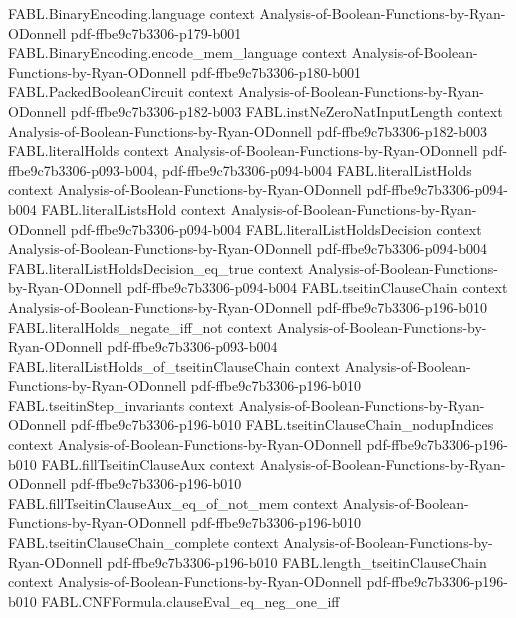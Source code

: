 \begin{theorem}
\proofstep
  {FABL.BinaryEncoding.language}
  {context}
  {Analysis-of-Boolean-Functions-by-Ryan-ODonnell}
  {pdf-ffbe9c7b3306-p179-b001}
\proofstep
  {FABL.BinaryEncoding.encode_mem_language}
  {context}
  {Analysis-of-Boolean-Functions-by-Ryan-ODonnell}
  {pdf-ffbe9c7b3306-p180-b001}
\proofstep
  {FABL.PackedBooleanCircuit}
  {context}
  {Analysis-of-Boolean-Functions-by-Ryan-ODonnell}
  {pdf-ffbe9c7b3306-p182-b003}
\proofstep
  {FABL.instNeZeroNatInputLength}
  {context}
  {Analysis-of-Boolean-Functions-by-Ryan-ODonnell}
  {pdf-ffbe9c7b3306-p182-b003}
\proofstep
  {FABL.literalHolds}
  {context}
  {Analysis-of-Boolean-Functions-by-Ryan-ODonnell}
  {pdf-ffbe9c7b3306-p093-b004,
    pdf-ffbe9c7b3306-p094-b004}
\proofstep
  {FABL.literalListHolds}
  {context}
  {Analysis-of-Boolean-Functions-by-Ryan-ODonnell}
  {pdf-ffbe9c7b3306-p094-b004}
\proofstep
  {FABL.literalListsHold}
  {context}
  {Analysis-of-Boolean-Functions-by-Ryan-ODonnell}
  {pdf-ffbe9c7b3306-p094-b004}
\proofstep
  {FABL.literalListHoldsDecision}
  {context}
  {Analysis-of-Boolean-Functions-by-Ryan-ODonnell}
  {pdf-ffbe9c7b3306-p094-b004}
\proofstep
  {FABL.literalListHoldsDecision_eq_true}
  {context}
  {Analysis-of-Boolean-Functions-by-Ryan-ODonnell}
  {pdf-ffbe9c7b3306-p094-b004}
\proofstep
  {FABL.tseitinClauseChain}
  {context}
  {Analysis-of-Boolean-Functions-by-Ryan-ODonnell}
  {pdf-ffbe9c7b3306-p196-b010}
\proofstep
  {FABL.literalHolds_negate_iff_not}
  {context}
  {Analysis-of-Boolean-Functions-by-Ryan-ODonnell}
  {pdf-ffbe9c7b3306-p093-b004}
\proofstep
  {FABL.literalListHolds_of_tseitinClauseChain}
  {context}
  {Analysis-of-Boolean-Functions-by-Ryan-ODonnell}
  {pdf-ffbe9c7b3306-p196-b010}
\proofstep
  {FABL.tseitinStep_invariants}
  {context}
  {Analysis-of-Boolean-Functions-by-Ryan-ODonnell}
  {pdf-ffbe9c7b3306-p196-b010}
\proofstep
  {FABL.tseitinClauseChain_nodupIndices}
  {context}
  {Analysis-of-Boolean-Functions-by-Ryan-ODonnell}
  {pdf-ffbe9c7b3306-p196-b010}
\proofstep
  {FABL.fillTseitinClauseAux}
  {context}
  {Analysis-of-Boolean-Functions-by-Ryan-ODonnell}
  {pdf-ffbe9c7b3306-p196-b010}
\proofstep
  {FABL.fillTseitinClauseAux_eq_of_not_mem}
  {context}
  {Analysis-of-Boolean-Functions-by-Ryan-ODonnell}
  {pdf-ffbe9c7b3306-p196-b010}
\proofstep
  {FABL.tseitinClauseChain_complete}
  {context}
  {Analysis-of-Boolean-Functions-by-Ryan-ODonnell}
  {pdf-ffbe9c7b3306-p196-b010}
\proofstep
  {FABL.length_tseitinClauseChain}
  {context}
  {Analysis-of-Boolean-Functions-by-Ryan-ODonnell}
  {pdf-ffbe9c7b3306-p196-b010}
\proofstep
  {FABL.CNFFormula.clauseEval_eq_neg_one_iff}

\end{theorem}
